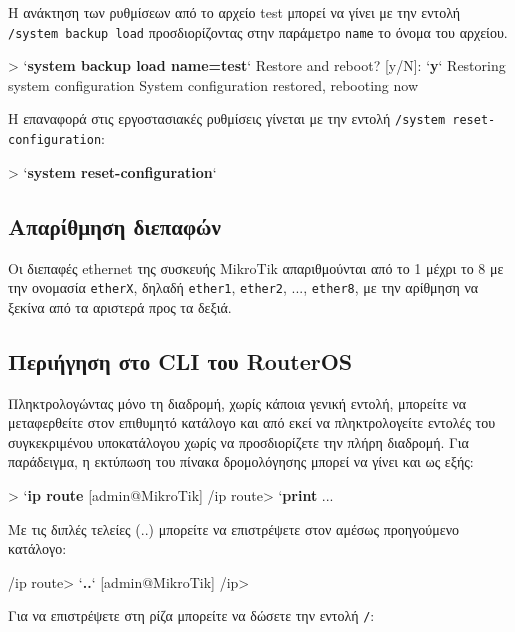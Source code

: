 \documentclass{EdipyLabs} %
\begin{document}
Η ανάκτηση των ρυθμίσεων από το αρχείο test μπορεί να γίνει με την εντολή \texttt{/system backup load} προσδιορίζοντας στην παράμετρο \texttt{name} το όνομα του αρχείου.

\begin{CommandBox}
 > `\textbf{system backup load name=test}`
Restore and reboot? [y/N]:
`\textbf{y}`
Restoring system configuration
System configuration restored, rebooting now
\end{CommandBox}

H επαναφορά στις εργοστασιακές ρυθμίσεις γίνεται με την εντολή \texttt{/system reset-configuration}:

\begin{CommandBox}
 > `\textbf{system reset-configuration}`
\end{CommandBox}

\subsection{Απαρίθμηση διεπαφών}

Οι διεπαφές ethernet της συσκευής MikroTik απαριθμούνται από το 1 μέχρι το 8 με την ονομασία \texttt{etherX}, δηλαδή \texttt{ether1}, \texttt{ether2}, ..., \texttt{ether8}, με την αρίθμηση να ξεκίνα από τα αριστερά προς τα δεξιά.

\subsection{Περιήγηση στο CLI του RouterOS}

Πληκτρολογώντας μόνο τη διαδρομή, χωρίς κάποια γενική εντολή, μπορείτε να μεταφερθείτε στον επιθυμητό κατάλογο και από εκεί να πληκτρολογείτε εντολές του συγκεκριμένου υποκατάλογου χωρίς να προσδιορίζετε την πλήρη διαδρομή. Για παράδειγμα, η εκτύπωση του πίνακα δρομολόγησης μπορεί να γίνει και ως εξής:

\begin{CommandBox}
 > `\textbf{ip route}
[admin@MikroTik] /ip route> `\textbf{print}
...
\end{CommandBox}

Με τις διπλές τελείες (..) μπορείτε να επιστρέψετε στον αμέσως προηγούμενο κατάλογο:

\begin{CommandBox}
 /ip route> `\textbf{..}`
[admin@MikroTik] /ip>
\end{CommandBox}

Για να επιστρέψετε στη ρίζα μπορείτε να δώσετε την εντολή \texttt{/}:
\end{document}
